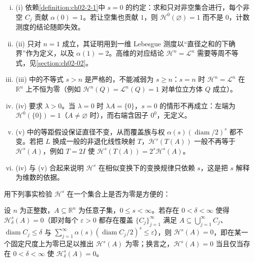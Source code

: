 \documentclass[../../main.tex]{subfiles}%
\begin{document}
\begin{remark}\label{remark:ch02-thm-2-2-条件}
\begin{enumerate}[(i)]
\item (i) 依赖\cref{definition:ch02-2-1}中 $s=0$ 的约定：求和只对非空集合进行，每个非空 $C_j$ 贡献 $\alpha(0)=1$。若让空集也贡献 $1$，则 $\mathcal{H}^0(\varnothing)=1$ 而不是 $0$，计数测度的结论随即失效。%
\item (ii) 只对 $n=1$ 成立，其证明用到一维 Lebesgue 测度以“直径之和的下确界”作为定义，以及 $\alpha(1)=2$。高维的对应结论 $\mathcal{H}^n=\mathcal{L}^n$ 需要等周不等式，见\cref{section:ch02-02}。%
\item (iii) 中的不等式 $s>n$ 是严格的，不能减弱为 $s\geqslant n$：$s=n$ 时 $\mathcal{H}^n=\mathcal{L}^n$ 在 $\mathbb{R}^n$ 上不恒为零（例如 $\mathcal{H}^n(Q)=\mathcal{L}^n(Q)=1$ 对单位立方体 $Q$ 成立）。
\item (iv) 要求 $\lambda>0$。当 $\lambda=0$ 时 $\lambda A=\{0\}$，$s=0$ 的情形不再成立：左端为 $\mathcal{H}^0(\{0\})=1$（$A\neq\varnothing$ 时），而右端含因子 $0^0$，无定义。
\item (v) 中的等距假设保证直径不变，从而覆盖族与权 $\alpha(s)(\operatorname{diam}/2)^s$ 都不变。若把 $L$ 换成一般的非退化线性映射 $T$，$\mathcal{H}^s(T(A))$ 一般不再等于 $\mathcal{H}^s(A)$，例如 $T=2I$ 使 $\mathcal{H}^s(T(A))=2^s\mathcal{H}^s(A)$。
\item (iv) 与 (v) 合起来说明 $\mathcal{H}^s$ 在相似变换下的变换规律只依赖 $s$，这是把 $s$ 解释为维数的依据。
\end{enumerate}
\end{remark}

用下列事实检验 $\mathcal{H}^s$ 在一个集合上是否为零是方便的：

\begin{lemma}\label{lemma:ch02-2-1}
设 $n$ 为正整数，$A\subseteq\mathbb{R}^n$ 为任意子集，$0\leqslant s<\infty$。若存在 $0<\delta<\infty$ 使得 $\mathcal{H}^s_\delta(A)=0$（即对每个 $\varepsilon>0$ 都存在覆盖 $\{C_j\}_{j=1}^{\infty}$ 满足 $A\subseteq\bigcup_{j=1}^{\infty}C_j$、$\operatorname{diam}C_j\leqslant\delta$ 与 $\sum_{j=1}^{\infty}\alpha(s)(\operatorname{diam}C_j/2)^s\leqslant\varepsilon$），则 $\mathcal{H}^s(A)=0$，即在某一个固定尺度上为零已足以推出 $\mathcal{H}^s(A)$ 为零；换言之，$\mathcal{H}^s(A)=0$ 当且仅当存在 $0<\delta<\infty$ 使 $\mathcal{H}^s_\delta(A)=0$。
\end{lemma}
\end{document}
